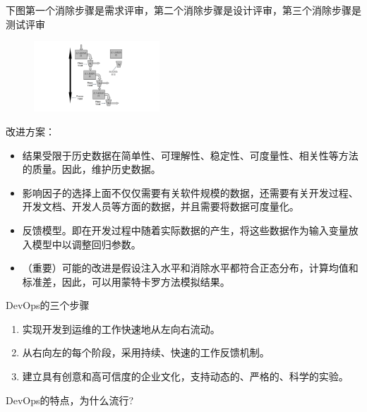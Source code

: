 \begin{solution}
下图第一个消除步骤是需求评审，第二个消除步骤是设计评审，第三个消除步骤是测试评审

\begin{figure}[H]
    \vspace{-0.5em}
	\centering
	\includegraphics[width=0.42\textwidth]{缺陷在开发过程中注入和消除的示意图.pdf}
    \vspace{-1em}
\end{figure}

改进方案：
\begin{itemize}
    \item 结果受限于历史数据在简单性、可理解性、稳定性、可度量性、相关性等方法的质量。因此，维护历史数据。
    \item 影响因子的选择上面不仅仅需要有关软件规模的数据，还需要有关开发过程、开发文档、开发人员等方面的数据，并且需要将数据可度量化。
    \item 反馈模型。即在开发过程中随着实际数据的产生，将这些数据作为输入变量放入模型中以调整回归参数。
    \item （重要）可能的改进是假设注入水平和消除水平都符合正态分布，计算均值和标准差，因此，可以用蒙特卡罗方法模拟结果。
\end{itemize}
\end{solution}



\begin{problem}[2016]
DevOps的三个步骤
\end{problem}

\begin{solution}
\begin{enumerate}[label=\arabic*.]
    \item 实现开发到运维的工作快速地从左向右流动。
    \item 从右向左的每个阶段，采用持续、快速的工作反馈机制。
    \item 建立具有创意和高可信度的企业文化，支持动态的、严格的、科学的实验。
\end{enumerate}
\end{solution}



\begin{problem}
DevOps的特点，为什么流行?
\end{problem}

